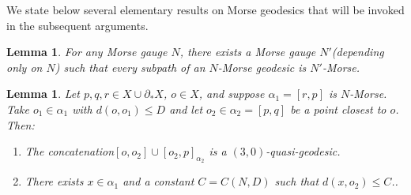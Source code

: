 \documentclass[a4paper,11pt,oneside]{article}
\newtheorem{Lemma}[Theorem]{Lemma}
\begin{document}
We state below several elementary results on Morse geodesics that will be invoked in the subsequent arguments.

\begin{Lemma}\label{Lemma:SubpathMorse}\cite{Liu21}
For any Morse gauge $N$, there exists a Morse gauge $N'$(depending only on $N$) such that every subpath of an $N$-Morse geodesic is $N'$-Morse.
\end{Lemma}


\begin{Lemma}\label{30QI}
Let $p,q,r\in X\cup\partial_*X$, $o\in X$, and suppose $\alpha_1=[r,p]$ is $N$-Morse. Take $o_1\in\alpha_1$ with $d(o,o_1)\le D$ and let $o_2\in\alpha_2=[p,q]$ be a point closest to $o$. Then:
\begin{enumerate}
\item The concatenation$[o,o_2]\cup[o_2,p]_{\alpha_2}$ is a $(3,0)$-quasi-geodesic.
\item There exists $x\in\alpha_1$ and a constant $C=C(N,D)$ such that $d(x,o_2)\le C$..
\end{enumerate}
\end{Lemma}
\end{document}
